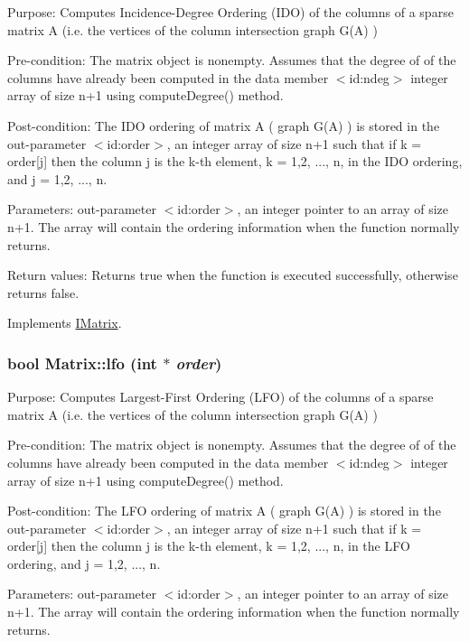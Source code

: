 Purpose: Computes Incidence-\/Degree Ordering (IDO) of the columns of a sparse matrix A (i.e. the vertices of the column intersection graph G(A) )

Pre-\/condition: The matrix object is nonempty. Assumes that the degree of of the columns have already been computed in the data member $<$id:ndeg$>$ integer array of size n+1 using computeDegree() method.

Post-\/condition: The IDO ordering of matrix A ( graph G(A) ) is stored in the out-\/parameter $<$id:order$>$, an integer array of size n+1 such that if k = order\mbox{[}j\mbox{]} then the column j is the k-\/th element, k = 1,2, ..., n, in the IDO ordering, and j = 1,2, ..., n.

Parameters: out-\/parameter $<$id:order$>$, an integer pointer to an array of size n+1. The array will contain the ordering information when the function normally returns.

Return values: Returns true when the function is executed successfully, otherwise returns false. 

Implements \hyperlink{classIMatrix_a8e0f3a1062786b6a20548e847de1109b}{IMatrix}.\hypertarget{classMatrix_a24f9f912233b249ba1bb8e18eb979121}{
\subsubsection[{lfo}]{\setlength{\rightskip}{0pt plus 5cm}bool Matrix::lfo (int $\ast$ {\em order})}}
\label{classMatrix_a24f9f912233b249ba1bb8e18eb979121}
Purpose: Computes Largest-\/First Ordering (LFO) of the columns of a sparse matrix A (i.e. the vertices of the column intersection graph G(A) )

Pre-\/condition: The matrix object is nonempty. Assumes that the degree of of the columns have already been computed in the data member $<$id:ndeg$>$ integer array of size n+1 using computeDegree() method.

Post-\/condition: The LFO ordering of matrix A ( graph G(A) ) is stored in the out-\/parameter $<$id:order$>$, an integer array of size n+1 such that if k = order\mbox{[}j\mbox{]} then the column j is the k-\/th element, k = 1,2, ..., n, in the LFO ordering, and j = 1,2, ..., n.

Parameters: out-\/parameter $<$id:order$>$, an integer pointer to an array of size n+1. The array will contain the ordering information when the function normally returns.

